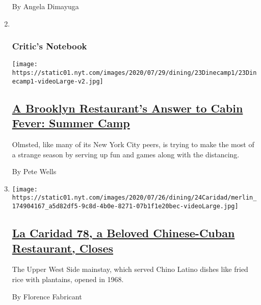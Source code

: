 \begin{enumerate}
  By Angela Dimayuga
\item ~
  \hypertarget{critics-notebook-1}{%
  \subsubsection{Critic's Notebook}\label{critics-notebook-1}}

  \texttt{[image: https://static01.nyt.com/images/2020/07/29/dining/23Dinecamp1/23Dinecamp1-videoLarge-v2.jpg]}

  \hypertarget{a-brooklyn-restaurants-answer-to-cabin-fever-summer-camp}{%
  \subsection{\texorpdfstring{\href{/2020/07/23/dining/outdoor-dining-olmsted-summer-camp.html}{A
  Brooklyn Restaurant's Answer to Cabin Fever: Summer
  Camp}}{A Brooklyn Restaurant's Answer to Cabin Fever: Summer Camp}}\label{a-brooklyn-restaurants-answer-to-cabin-fever-summer-camp}}

  Olmsted, like many of its New York City peers, is trying to make the
  most of a strange season by serving up fun and games along with the
  distancing.

  By Pete Wells
\item
  \texttt{[image: https://static01.nyt.com/images/2020/07/26/dining/24Caridad/merlin\_174904167\_a5d82df5-9c8d-4b0e-8271-07b1f1e20bec-videoLarge.jpg]}

  \hypertarget{la-caridad-78-a-beloved-chinese-cuban-restaurant-closes}{%
  \subsection{\texorpdfstring{\href{/2020/07/24/dining/la-caridad-78-closes.html}{La
  Caridad 78, a Beloved Chinese-Cuban Restaurant,
  Closes}}{La Caridad 78, a Beloved Chinese-Cuban Restaurant, Closes}}\label{la-caridad-78-a-beloved-chinese-cuban-restaurant-closes}}

  The Upper West Side mainstay, which served Chino Latino dishes like
  fried rice with plantains, opened in 1968.

  By Florence Fabricant
\end{enumerate}

